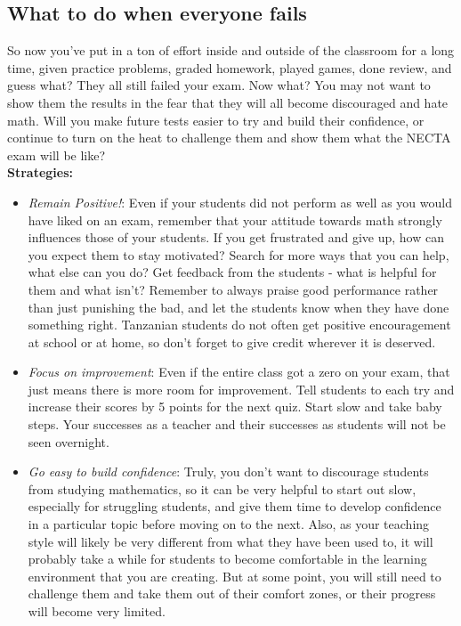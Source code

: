 \subsection{What to do when everyone fails}
So now you've put in a ton of effort inside and outside of the classroom for a long time, given practice problems, graded homework, played games, done review, and guess what? They all still failed your exam. Now what? You may not want to show them the results in the fear that they will all become discouraged and hate math. Will you make future tests easier to try and build their confidence, or continue to turn on the heat to challenge them and show them what the NECTA exam will be like?\\

\textbf{Strategies:}
\begin{itemize}
\item\emph{Remain Positive!}: Even if your students did not perform as well as you would have liked on an exam, remember that your attitude towards math strongly influences those of your students. If you get frustrated and give up, how can you expect them to stay motivated? Search for more ways that you can help, what else can you do? Get feedback from the students - what is helpful for them and what isn't? Remember to always praise good performance rather than just punishing the bad, and let the students know when they have done something right. Tanzanian students do not often get positive encouragement at school or at home, so don't forget to give credit wherever it is deserved.

\item\emph{Focus on improvement}: Even if the entire class got a zero on your exam, that just means there is more room for improvement. Tell students to each try and increase their scores by 5 points for the next quiz. Start slow and take baby steps. Your successes as a teacher and their successes as students will not be seen overnight.

\item\emph{Go easy to build confidence}: Truly, you don't want to discourage students from studying mathematics, so it can be very helpful to start out slow, especially for struggling students, and give them time to develop confidence in a particular topic before moving on to the next. Also, as your teaching style will likely be very different from what they have been used to, it will probably take a while for students to become comfortable in the learning environment that you are creating. But at some point, you will still need to challenge them and take them out of their comfort zones, or their progress will become very limited.


\end{itemize}
